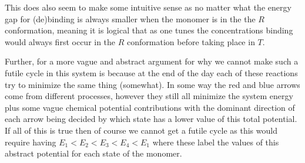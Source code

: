 \documentclass[11pt]{article}
\begin{document}
This does also seem to make some intuitive sense as no matter what the energy gap for (de)binding is always smaller when the monomer is in the the $R$ conformation, meaning it is logical that as one tunes the concentrations binding would always first occur in the $R$ conformation before taking place in $T$.

Further, for a more vague and abstract argument for why we cannot make such a futile cycle in this system is because at the end of the day each of these reactions try to minimize the same thing (somewhat).
In some way the red and blue arrows come from different processes, however they still all minimize the system energy plus some vague chemical potential contributions with the dominant direction of each arrow being decided by which state has a lower value of this total potential.
If all of this is true then of course we cannot get a futile cycle as this would require having $E_1 < E_2 < E_3 < E_4 < E_1$ where these label the values of this abstract potential for each state of the monomer.
\end{document}
